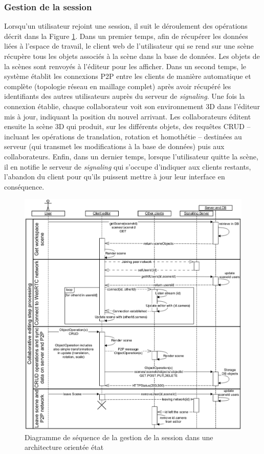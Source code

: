 \subsubsection{Gestion de la session}
Lorsqu'un utilisateur rejoint une session, il suit le déroulement des opérations 
décrit dans la Figure \ref{fig:sequence_state}. 
Dans un premier temps, afin de récupérer les données liées à l'espace de travail, 
le client web de l'utilisateur qui se rend sur une scène récupère 
tous les objets associés à la scène dans la base de données. Les objets de la 
scènes sont renvoyés à l'éditeur pour les afficher. 
Dans un second temps, le système établit les connexions \gls{P2P} entre les 
clients de manière automatique et complète (topologie réseau en maillage 
complet) après avoir récupéré les identifiants des autres utilisateurs auprès du 
serveur de \textit{signaling}. Une fois la connexion établie, chaque collaborateur 
voit son environnement 3D dans l'éditeur mis à jour, indiquant la position du nouvel 
arrivant. Les collaborateurs éditent ensuite la scène 3D qui produit, sur les 
différents objets, des requêtes \gls{CRUD} -- incluant les opérations de translation, 
rotation et homothétie -- destinées au serveur (qui transmet les 
modifications à la base de données) puis aux collaborateurs.
Enfin, dans un dernier temps, lorsque l'utilisateur quitte la scène, il en notifie le 
serveur de \textit{signaling} qui s'occupe d'indiquer aux clients restants, l'abandon 
du client pour qu'ils puissent mettre à jour leur interface en conséquence.

\begin{figure}[ht!]
	\centering
	\includegraphics[trim={0 0 0 3cm},clip,width=1\columnwidth]
	{eps/sequence_wscg.eps}
	\caption{Diagramme de séquence de la gestion de la session dans une 
	architecture \og orientée état\fg{}}
	\label{fig:sequence_state}
\end{figure}

